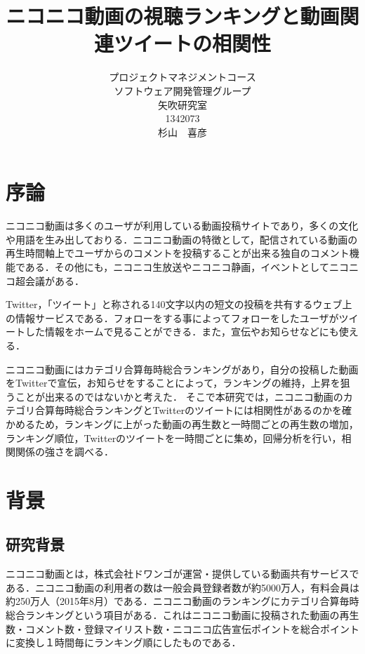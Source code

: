 \title{ニコニコ動画の視聴ランキングと動画関連ツイートの相関性}
\author{プロジェクトマネジメントコース\\
ソフトウェア開発管理グループ\\
矢吹研究室\\
1342073\\
杉山　喜彦}
\date{}

\maketitle



\tableofcontents%

\chapter{序論}
ニコニコ動画は多くのユーザが利用している動画投稿サイトであり，多くの文化や用語を生み出しておりる．ニコニコ動画の特徴として，配信されている動画の再生時間軸上でユーザからのコメントを投稿することが出来る独自のコメント機能である．その他にも，ニコニコ生放送やニコニコ静画，イベントとしてニコニコ超会議がある．

Twitter，「ツイート」と称される140文字以内の短文の投稿を共有するウェブ上の情報サービスである．フォローをする事によってフォローをしたユーザがツイートした情報をホームで見ることができる．また，宣伝やお知らせなどにも使える．

ニコニコ動画にはカテゴリ合算毎時総合ランキングがあり，自分の投稿した動画をTwitterで宣伝，お知らせをすることによって，ランキングの維持，上昇を狙うことが出来るのではないかと考えた．
そこで本研究では，ニコニコ動画のカテゴリ合算毎時総合ランキングとTwitterのツイートには相関性があるのかを確かめるため，ランキングに上がった動画の再生数と一時間ごとの再生数の増加，ランキング順位，Twitterのツイートを一時間ごとに集め，回帰分析を行い，相関関係の強さを調べる．
\chapter{背景}
\section{研究背景}
ニコニコ動画とは，株式会社ドワンゴが運営・提供している動画共有サービスである．ニコニコ動画の利用者の数は一般会員登録者数が約5000万人，有料会員は約250万人（2015年8月）である\cite{iii}．ニコニコ動画のランキングにカテゴリ合算毎時総合ランキングという項目がある．これはニコニコ動画に投稿された動画の再生数・コメント数・登録マイリスト数・ニコニコ広告宣伝ポイントを総合ポイントに変換し１時間毎にランキング順にしたものである．

